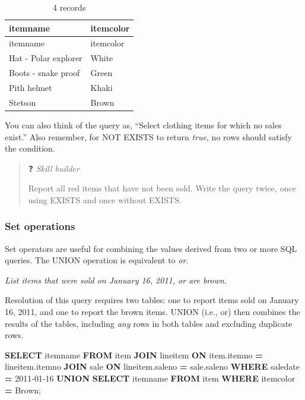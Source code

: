 \documentclass[
]{article}
\newenvironment{Shaded}{\begin{snugshade}}{\end{snugshade}}
\newcommand{\KeywordTok}[1]{\textcolor[rgb]{0.13,0.29,0.53}{\textbf{#1}}}
\newcommand{\NormalTok}[1]{#1}
\newcommand{\OperatorTok}[1]{\textcolor[rgb]{0.81,0.36,0.00}{\textbf{#1}}}
\newcommand{\StringTok}[1]{\textcolor[rgb]{0.31,0.60,0.02}{#1}}
\begin{document}
\begin{longtable}[]{@{}ll@{}}
\caption{4 records}\tabularnewline
\toprule()
itemname & itemcolor \\
\midrule()
\endfirsthead
\toprule()
itemname & itemcolor \\
\midrule()
\endhead
Hat - Polar explorer & White \\
Boots - snake proof & Green \\
Pith helmet & Khaki \\
Stetson & Brown \\
\bottomrule()
\end{longtable}

You can also think of the query as, ``Select clothing items for which no
sales exist.'' Also remember, for NOT EXISTS to return \emph{true}, no
rows should satisfy the condition.

\begin{quote}
❓ \emph{Skill builder}

Report all red items that have not been sold. Write the query twice,
once using EXISTS and once without EXISTS.
\end{quote}

\hypertarget{set-operations}{%
\subsubsection*{Set operations}\label{set-operations}}

Set operators are useful for combining the values derived from two or
more SQL queries. The UNION operation is equivalent to \emph{or}.

\emph{List items that were sold on January 16, 2011, or are brown.}

Resolution of this query requires two tables: one to report items sold
on January 16, 2011, and one to report the brown items. UNION (i.e., or)
then combines the results of the tables, including \emph{any} rows in
both tables and excluding duplicate rows.

\begin{Shaded}
\begin{Highlighting}[]
\KeywordTok{SELECT}\NormalTok{ itemname }\KeywordTok{FROM}\NormalTok{ item }\KeywordTok{JOIN}\NormalTok{ lineitem}
    \KeywordTok{ON}\NormalTok{ item.itemno }\OperatorTok{=}\NormalTok{ lineitem.itemno}
    \KeywordTok{JOIN}\NormalTok{ sale}
    \KeywordTok{ON}\NormalTok{ lineitem.saleno }\OperatorTok{=}\NormalTok{ sale.saleno}
    \KeywordTok{WHERE}\NormalTok{ saledate }\OperatorTok{=} \StringTok{\textquotesingle{}2011{-}01{-}16\textquotesingle{}}
\KeywordTok{UNION}
    \KeywordTok{SELECT}\NormalTok{ itemname }\KeywordTok{FROM}\NormalTok{ item }\KeywordTok{WHERE}\NormalTok{ itemcolor }\OperatorTok{=} \StringTok{\textquotesingle{}Brown\textquotesingle{}}\NormalTok{;}
\end{Highlighting}
\end{Shaded}
\end{document}
